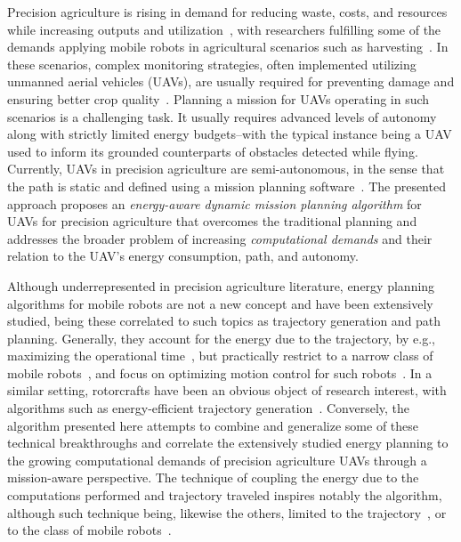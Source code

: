 \documentclass[letterpaper,10pt,conference]{ieeeconf}
\begin{document}
Precision agriculture is rising in demand for reducing waste, costs, and resources while increasing outputs and utilization~\cite{hajjaj2014review}, with researchers fulfilling some of the demands applying mobile robots in agricultural scenarios such as harvesting~\cite{qingchun2012study,dong2011development, de2011design, aljanobi2010setup, li2008analysis, edan2000robotic}. In these scenarios, complex monitoring strategies, often implemented utilizing unmanned aerial vehicles (UAVs), are usually required for preventing damage and ensuring better crop quality~\cite{puri2017agriculture}. Planning a mission for UAVs operating in such scenarios is a challenging task. It usually requires advanced levels of autonomy along with strictly limited energy budgets--with the typical instance being a UAV used to inform its grounded counterparts of obstacles detected while flying. Currently, UAVs in precision agriculture are semi-autonomous, in the sense that the path is static and defined using a mission planning software~\cite{daponte2019review}. The presented approach proposes an \emph{energy-aware dynamic mission planning algorithm} for UAVs for precision agriculture that overcomes the traditional planning and addresses the broader problem of increasing \emph{computational demands} and their relation to the UAV's energy consumption, path, and autonomy.

Although underrepresented in precision agriculture literature, energy planning algorithms for mobile robots are not a new concept and have been extensively studied, being these correlated to such topics as trajectory generation and path planning. Generally, they account for the energy due to the trajectory, by e.g., maximizing the operational time~\cite{wahab2015energy}, but practically restrict to a narrow class of mobile robots~\cite{kim2005energy}, and focus on optimizing motion control for such robots~\cite{kim2008minimum}. In a similar setting, rotorcrafts have been an obvious object of research interest, with algorithms such as energy-efficient trajectory generation~\cite{morbidi2016minimum,kreciglowa2017energy}. Conversely, the algorithm presented here attempts to combine and generalize some of these technical breakthroughs and correlate the extensively studied energy planning to the growing computational demands of precision agriculture UAVs through a mission-aware perspective.
The technique of coupling the energy due to the computations performed and trajectory traveled inspires notably the algorithm, although such technique being, likewise the others, limited to the trajectory~\cite{mei2004energy,mei2005case,mei2006deployment}, or to the class of mobile robots~\cite{sadrpour2013mission,sadrpour2013experimental}.
\end{document}
